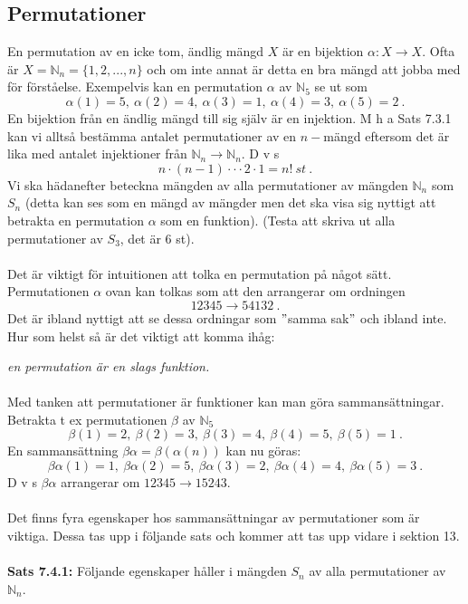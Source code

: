 \documentclass{article}
\begin{document}
\subsection{Permutationer}
En permutation av en icke tom, ändlig mängd $X$ är en bijektion $\alpha:X\rightarrow X$. Ofta är $X=\mathbb{N}_n=\{1,2,...,n\}$ och om inte annat är detta en bra mängd att jobba med för förståelse. Exempelvis kan en permutation $\alpha$ av $\mathbb{N}_5$ se ut som
$$
\alpha(1)=5, \ \alpha(2)=4, \ \alpha(3)=1, \ \alpha(4)=3, \ \alpha(5)=2 \ .
$$
En bijektion från en ändlig mängd till sig själv är en injektion. M h a Sats 7.3.1 kan vi alltså bestämma antalet permutationer av en $n-$mängd eftersom det är lika med antalet injektioner från $\mathbb{N}_n\rightarrow\mathbb{N}_n$. D v s
$$
n\cdot(n-1)\cdot\cdot\cdot2\cdot1=n! \ st \ .
$$
Vi ska hädanefter beteckna mängden av alla permutationer av mängden $\mathbb{N}_n$ som $S_n$ (detta kan ses som en mängd av mängder men det ska visa sig nyttigt att betrakta en permutation $\alpha$ som en funktion). (Testa att skriva ut alla permutationer av $S_3$, det är 6 st).\\ \\ Det är viktigt för intuitionen att tolka en permutation på något sätt. Permutationen $\alpha$ ovan kan tolkas som att den arrangerar om ordningen
$$
12345 \longrightarrow 54132 \ .
$$
Det är ibland nyttigt att se dessa ordningar som $"$samma sak$"$ och ibland inte. Hur som helst så är det viktigt att komma ihåg:

\textit{en permutation är en slags funktion.}\\ \\ 
Med tanken att permutationer är funktioner kan man göra sammansättningar. Betrakta t ex permutationen $\beta$ av $\mathbb{N}_5$
$$
\beta(1)=2, \ \beta(2)=3, \ \beta(3)=4,\ \beta(4)=5, \ \beta(5)=1 \ .
$$
En sammansättning $\beta\alpha=\beta(\alpha(n))$ kan nu göras:
$$
\beta\alpha(1)=1, \ \beta\alpha(2)=5, \ \beta\alpha(3)=2, \ \beta\alpha(4)=4, \ \beta\alpha(5)=3 \ .
$$
D v s $\beta\alpha$ arrangerar om $12345\longrightarrow 15243$.\\ \\ 
Det finns fyra egenskaper hos sammansättningar av permutationer som är viktiga. Dessa tas upp i följande sats och kommer att tas upp vidare i sektion 13.\\ \\ 
\textbf{Sats 7.4.1:} Följande egenskaper håller i mängden $S_n$ av alla permutationer av $\mathbb{N}_n$.\\ 
\end{document}
